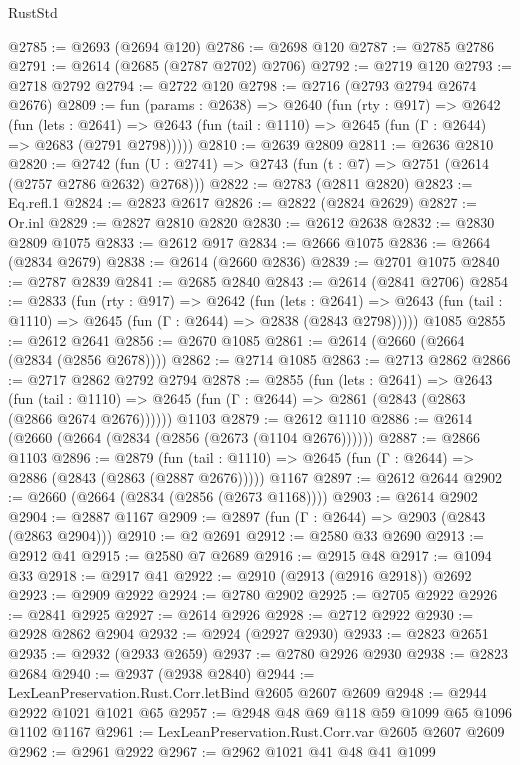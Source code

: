 \begin{lexlean}{RustStd}
\begin{coremodule}
@2785 := @2693 (@2694 @120)
@2786 := @2698 @120
@2787 := @2785 @2786
@2791 := @2614 (@2685 (@2787 @2702) @2706)
@2792 := @2719 @120
@2793 := @2718 @2792
@2794 := @2722 @120
@2798 := @2716 (@2793 @2794 @2674 @2676)
@2809 := fun (params : @2638) =>
  @2640
    (fun (rty : @917) =>
    @2642
      (fun (lets : @2641) =>
      @2643 (fun (tail : @1110) => @2645 (fun (Γ : @2644) => @2683 (@2791 @2798)))))
@2810 := @2639 @2809
@2811 := @2636 @2810
@2820 := @2742 (fun (U : @2741) => @2743 (fun (t : @7) => @2751 (@2614 (@2757 @2786 @2632) @2768)))
@2822 := @2783 (@2811 @2820)
@2823 := Eq.refl.{1}
@2824 := @2823 @2617
@2826 := @2822 (@2824 @2629)
@2827 := Or.inl
@2829 := @2827 @2810 @2820
@2830 := @2612 @2638
@2832 := @2830 @2809 @1075
@2833 := @2612 @917
@2834 := @2666 @1075
@2836 := @2664 (@2834 @2679)
@2838 := @2614 (@2660 @2836)
@2839 := @2701 @1075
@2840 := @2787 @2839
@2841 := @2685 @2840
@2843 := @2614 (@2841 @2706)
@2854 := @2833
    (fun (rty : @917) =>
    @2642
      (fun (lets : @2641) =>
      @2643 (fun (tail : @1110) => @2645 (fun (Γ : @2644) => @2838 (@2843 @2798)))))
    @1085
@2855 := @2612 @2641
@2856 := @2670 @1085
@2861 := @2614 (@2660 (@2664 (@2834 (@2856 @2678))))
@2862 := @2714 @1085
@2863 := @2713 @2862
@2866 := @2717 @2862 @2792 @2794
@2878 := @2855
    (fun (lets : @2641) =>
    @2643
      (fun (tail : @1110) => @2645 (fun (Γ : @2644) => @2861 (@2843 (@2863 (@2866 @2674 @2676))))))
    @1103
@2879 := @2612 @1110
@2886 := @2614 (@2660 (@2664 (@2834 (@2856 (@2673 (@1104 @2676))))))
@2887 := @2866 @1103
@2896 := @2879
    (fun (tail : @1110) => @2645 (fun (Γ : @2644) => @2886 (@2843 (@2863 (@2887 @2676)))))
    @1167
@2897 := @2612 @2644
@2902 := @2660 (@2664 (@2834 (@2856 (@2673 @1168))))
@2903 := @2614 @2902
@2904 := @2887 @1167
@2909 := @2897 (fun (Γ : @2644) => @2903 (@2843 (@2863 @2904)))
@2910 := @2 @2691
@2912 := @2580 @33 @2690
@2913 := @2912 @41
@2915 := @2580 @7 @2689
@2916 := @2915 @48
@2917 := @1094 @33
@2918 := @2917 @41
@2922 := @2910 (@2913 (@2916 @2918)) @2692
@2923 := @2909 @2922
@2924 := @2780 @2902
@2925 := @2705 @2922
@2926 := @2841 @2925
@2927 := @2614 @2926
@2928 := @2712 @2922
@2930 := @2928 @2862 @2904
@2932 := @2924 (@2927 @2930)
@2933 := @2823 @2651
@2935 := @2932 (@2933 @2659)
@2937 := @2780 @2926 @2930
@2938 := @2823 @2684
@2940 := @2937 (@2938 @2840)
@2944 := LexLeanPreservation.Rust.Corr.letBind @2605 @2607 @2609
@2948 := @2944 @2922 @1021 @1021 @65
@2957 := @2948 @48 @69 @118 @59 @1099 @65 @1096 @1102 @1167
@2961 := LexLeanPreservation.Rust.Corr.var @2605 @2607 @2609
@2962 := @2961 @2922
@2967 := @2962 @1021 @41 @48 @41 @1099

\end{coremodule}
\end{lexlean}
